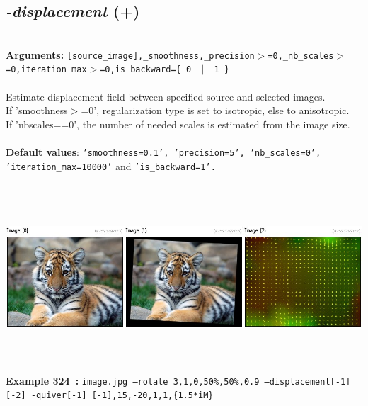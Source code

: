 \documentclass[a4paper,11pt,twoside]{book}
\begin{document}
\subsection{\emph{-displacement} (+)}\vspace*{-0.5em}
~\\\textbf{Arguments: } 
{\small \texttt{[source\_image],\_smoothness,\_precision$>$=0,\_nb\_scales$>$=0,iteration\_max$>$=0,is\_backward=\{ 0 ~$|$~ 1 \}}}\\~\\
Estimate displacement field between specified source and selected images.
~\\If 'smoothness$>$=0', regularization type is set to isotropic, else to anisotropic.
~\\If 'nbscales==0', the number of needed scales is estimated from the image size.
~\\~\\\textbf{Default values}: {\small \texttt{'smoothness=0.1', 'precision=5', 'nb\_scales=0', 'iteration\_max=10000'} and \texttt{'is\_backward=1'.}}
\begin{center}\includegraphics[keepaspectratio=true,height=7cm,width=\textwidth]{img/gmic_def324.jpg}\\
{\footnotesize \textbf{Example 324~:} \texttt{image.jpg --rotate 3,1,0,50\%,50\%,0.9 --displacement[-1] [-2] -quiver[-1] [-1],15,-20,1,1,\{1.5*iM\}}}
\end{center}
\end{document}
